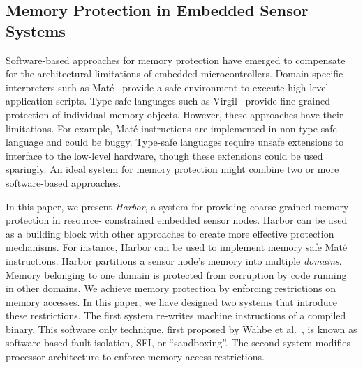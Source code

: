 \subsection{Memory Protection in Embedded Sensor Systems}
%
Software-based approaches for memory protection have emerged to
compensate for the architectural limitations of embedded
microcontrollers.
%
Domain specific interpreters such as Mat\'e~\cite{asvm05nsdi} provide
a safe environment to execute high-level application scripts.
%
Type-safe languages such as Virgil~\cite{titzer06virgil} provide
fine-grained protection of individual memory objects.
%
However, these approaches have their limitations.
%
For example, Mat\'e instructions are implemented in non type-safe
language and could be buggy.
%
Type-safe languages require unsafe extensions to interface to the
low-level hardware, though these extensions could be used sparingly.
%
An ideal system for memory protection might combine two or
more software-based approaches.
%


In this paper, we present \emph{Harbor}, a system for providing
coarse-grained memory protection in resource-%
constrained embedded sensor nodes.
%
Harbor can be used as a building block with other approaches to create
more effective protection mechanisms.
%
For instance, Harbor can be used to implement memory safe Mat\'e
instructions.
%
Harbor partitions a sensor node's memory into
multiple \textit{domains}.
%
Memory belonging to one domain is protected from corruption by code running
in other domains.
%
We achieve memory protection by enforcing restrictions on memory accesses.
%
In this paper, we have designed two systems that introduce these restrictions.
%
The first system re-writes machine instructions of a compiled binary.
%
This software only technique, first proposed by Wahbe et al.~\cite{wahbe93sfi}, is
known as software-based fault isolation, SFI, or ``sandboxing''.
%
The second system modifies processor architecture to enforce memory
access restrictions.
%


